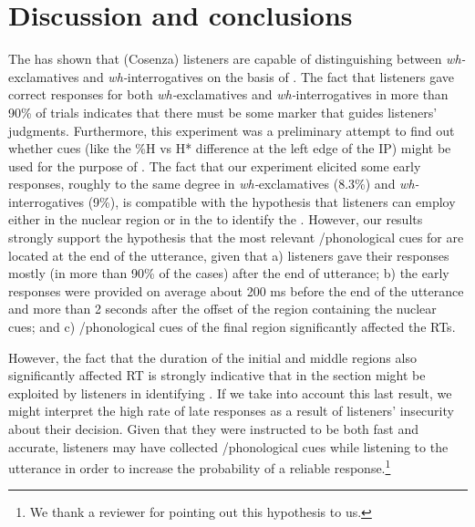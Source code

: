 \documentclass[output=paper]{langsci/langscibook}
\begin{document}
\section{Discussion and conclusions}
\label{sec:kel:6}
\largerpage

The  has shown that (Cosenza)  listeners are capable of distinguishing between \textit{wh-}exclamatives and \textit{wh-}interrogatives on the basis of . The fact that listeners gave correct responses for both \textit{wh-}exclamatives and \textit{wh-}interrogatives in more than 90\% of trials indicates that there must be some  marker that guides listeners’ judgments. Furthermore, this experiment was a preliminary attempt to find out whether  cues (like the \%H vs H* difference at the left edge of the IP) might be used for the purpose of . The fact that our experiment elicited some early responses, roughly to the same degree in \textit{wh-}exclamatives (8.3\%) and \textit{wh-}interrogatives (9\%), is compatible with the hypothesis that listeners can employ  either in the nuclear region or in the  to identify the . However, our results strongly support the hypothesis that the most relevant /phonological cues for  are located at the end of the utterance, given that a) listeners gave their responses mostly (in more than 90\% of the cases) after the end of utterance; b) the early responses were provided on average about 200 ms before the end of the utterance and more than 2 seconds after the offset of the region containing the nuclear cues; and c) /phonological cues of the final region significantly affected the RTs. 

However, the fact that the duration of the initial and middle regions also significantly affected RT is strongly indicative that  in the  section might be exploited by listeners in identifying . If we take into account this last result, we might interpret the high rate of late responses as a result of listeners’ insecurity about their decision. Given that they were instructed to be both fast and accurate, listeners may have collected /phonological cues while listening to the utterance in order to increase the probability of a reliable response.\footnote{We thank a reviewer for pointing out this hypothesis to us.}
\end{document}
